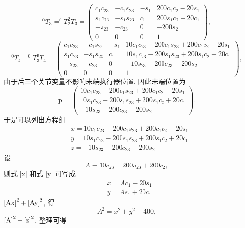 \documentclass{article}
\begin{document}
\[
^0T_3 = ^0T_2 ^2T_3 = 
\begin{pmatrix}
c_1 c_{23} & -c_1 s_{23} & -s_1 & 200c_1c_2-20s_1\\
s_1 c_{23} & -s_1 s_{23} & c_1 & 200s_1c_2+20c_1\\
-s_{23} & -c_{23} & 0 & -200s_2\\
0 & 0 & 0 & 1
\end{pmatrix},
\]
\[
^0T_4 = ^0T_3 ^3T_4 = 
\begin{pmatrix}
c_1 c_{23} & -c_1 s_{23} & -s_1 & 10c_1c_{23}-200c_1s_{23}+200c_1c_2-20s_1\\
s_1 c_{23} & -s_1 s_{23} & c_1 & 10s_1c_{23}-200s_1s_{23}+200s_1c_2+20c_1\\
-s_{23} & -c_{23} & 0 & -10s_{23}-200c_{23}-200s_2\\
0 & 0 & 0 & 1
\end{pmatrix},
\]
由于后三个关节变量不影响末端执行器位置, 因此末端位置为
\[
\mathbf{p} =
\begin{pmatrix}
10c_1c_{23}-200c_1s_{23}+200c_1c_2-20s_1\\ 10s_1c_{23}-200s_1s_{23}+200s_1c_2+20c_1\\ -10s_{23}-200c_{23}-200s_2
\end{pmatrix}.
\]
于是可以列出方程组
\begin{subequations}
    \label{fkine}
    \begin{align}
     &x = 10c_1c_{23}-200c_1s_{23}+200c_1c_2-20s_1 \label{x} \\
     &y = 10s_1c_{23}-200s_1s_{23}+200s_1c_2+20c_1 \label{y} \\
     &z = -10s_{23}-200c_{23}-200s_2 \label{z}
    \end{align}
\end{subequations}
设
\begin{equation}
\label{A}
A = 10c_{23}-200s_{23}+200c_2,
\end{equation}
则式 \eqref{x} 和式 \eqref{y} 可写成
\begin{subequations}
    \begin{align}
     &x = Ac_1 - 20s_1 \label{Ax} \\
     &y = As_1 + 20c_1 \label{Ay}
    \end{align}
\end{subequations}
$\eqref{Ax}^2 + \eqref{Ay}^2$, 得
\begin{equation}
\label{Axy}
A^2 = x^2 + y^2 - 400,
\end{equation}
$\eqref{A}^2 + \eqref{z}^2$, 整理可得
\end{document}
